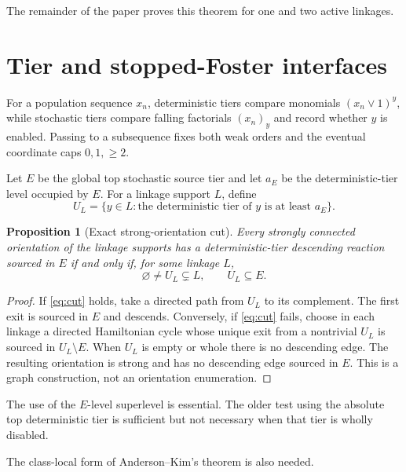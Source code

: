\documentclass[11pt]{article}
\newtheorem{proposition}[theorem]{Proposition}
\theoremstyle{definition}
\theoremstyle{remark}
\newcommand{\1}{\mathbf 1}
\begin{document}
The remainder of the paper proves this theorem for one and two active
linkages.

\section{Tier and stopped-Foster interfaces}

For a population sequence $x_n$, deterministic tiers compare monomials
$(x_n\vee1)^y$, while stochastic tiers compare falling factorials $(x_n)_y$
and record whether $y$ is enabled.  Passing to a subsequence fixes both weak
orders and the eventual coordinate caps $0,1,\ge2$.

Let $E$ be the global top stochastic source tier and let $a_E$ be the
deterministic-tier level occupied by $E$.  For a linkage support $L$, define
\begin{equation}\label{eq:superlevel}
 U_L=\{y\in L: \text{the deterministic tier of }y
                    \text{ is at least }a_E\}.
\end{equation}

\begin{proposition}[Exact strong-orientation cut]\label{prop:cut}
Every strongly connected orientation of the linkage supports has a
deterministic-tier descending reaction sourced in $E$ if and only if, for
some linkage $L$,
\begin{equation}\label{eq:cut}
          \varnothing\ne U_L\subsetneq L,
          \qquad U_L\subseteq E.
\end{equation}
\end{proposition}

\begin{proof}
If \eqref{eq:cut} holds, take a directed path from $U_L$ to its complement.
The first exit is sourced in $E$ and descends.  Conversely, if
\eqref{eq:cut} fails, choose in each linkage a directed Hamiltonian cycle
whose unique exit from a nontrivial $U_L$ is sourced in
$U_L\setminus E$.  When $U_L$ is empty or whole there is no descending edge.
The resulting orientation is strong and has no descending edge sourced in
$E$.  This is a graph construction, not an orientation enumeration.
\end{proof}

The use of the $E$-level superlevel is essential.  The older test using the
absolute top deterministic tier is sufficient but not necessary when that
tier is wholly disabled.

The class-local form of Anderson--Kim's theorem is also needed.
\end{document}
